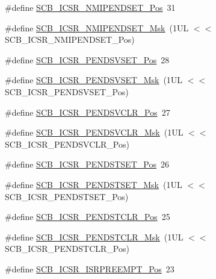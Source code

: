 \begin{DoxyCompactItemize}
\item 
\#define \mbox{\hyperlink{group___c_m_s_i_s___s_c_b_ga750d4b52624a46d71356db4ea769573b}{S\+C\+B\+\_\+\+I\+C\+S\+R\+\_\+\+N\+M\+I\+P\+E\+N\+D\+S\+E\+T\+\_\+\+Pos}}~31
\item 
\#define \mbox{\hyperlink{group___c_m_s_i_s___s_c_b_ga340e3f79e9c3607dee9f2c048b6b22e8}{S\+C\+B\+\_\+\+I\+C\+S\+R\+\_\+\+N\+M\+I\+P\+E\+N\+D\+S\+E\+T\+\_\+\+Msk}}~(1\+U\+L $<$$<$ S\+C\+B\+\_\+\+I\+C\+S\+R\+\_\+\+N\+M\+I\+P\+E\+N\+D\+S\+E\+T\+\_\+\+Pos)
\item 
\#define \mbox{\hyperlink{group___c_m_s_i_s___s_c_b_gab5ded23d2ab1d5ff7cc7ce746205e9fe}{S\+C\+B\+\_\+\+I\+C\+S\+R\+\_\+\+P\+E\+N\+D\+S\+V\+S\+E\+T\+\_\+\+Pos}}~28
\item 
\#define \mbox{\hyperlink{group___c_m_s_i_s___s_c_b_ga1e40d93efb402763c8c00ddcc56724ff}{S\+C\+B\+\_\+\+I\+C\+S\+R\+\_\+\+P\+E\+N\+D\+S\+V\+S\+E\+T\+\_\+\+Msk}}~(1\+U\+L $<$$<$ S\+C\+B\+\_\+\+I\+C\+S\+R\+\_\+\+P\+E\+N\+D\+S\+V\+S\+E\+T\+\_\+\+Pos)
\item 
\#define \mbox{\hyperlink{group___c_m_s_i_s___s_c_b_gae218d9022288f89faf57187c4d542ecd}{S\+C\+B\+\_\+\+I\+C\+S\+R\+\_\+\+P\+E\+N\+D\+S\+V\+C\+L\+R\+\_\+\+Pos}}~27
\item 
\#define \mbox{\hyperlink{group___c_m_s_i_s___s_c_b_ga4a901ace381d3c1c74ac82b22fae2e1e}{S\+C\+B\+\_\+\+I\+C\+S\+R\+\_\+\+P\+E\+N\+D\+S\+V\+C\+L\+R\+\_\+\+Msk}}~(1\+U\+L $<$$<$ S\+C\+B\+\_\+\+I\+C\+S\+R\+\_\+\+P\+E\+N\+D\+S\+V\+C\+L\+R\+\_\+\+Pos)
\item 
\#define \mbox{\hyperlink{group___c_m_s_i_s___s_c_b_ga9dbb3358c6167c9c3f85661b90fb2794}{S\+C\+B\+\_\+\+I\+C\+S\+R\+\_\+\+P\+E\+N\+D\+S\+T\+S\+E\+T\+\_\+\+Pos}}~26
\item 
\#define \mbox{\hyperlink{group___c_m_s_i_s___s_c_b_ga7325b61ea0ec323ef2d5c893b112e546}{S\+C\+B\+\_\+\+I\+C\+S\+R\+\_\+\+P\+E\+N\+D\+S\+T\+S\+E\+T\+\_\+\+Msk}}~(1\+U\+L $<$$<$ S\+C\+B\+\_\+\+I\+C\+S\+R\+\_\+\+P\+E\+N\+D\+S\+T\+S\+E\+T\+\_\+\+Pos)
\item 
\#define \mbox{\hyperlink{group___c_m_s_i_s___s_c_b_gadbe25e4b333ece1341beb1a740168fdc}{S\+C\+B\+\_\+\+I\+C\+S\+R\+\_\+\+P\+E\+N\+D\+S\+T\+C\+L\+R\+\_\+\+Pos}}~25
\item 
\#define \mbox{\hyperlink{group___c_m_s_i_s___s_c_b_gab241827d2a793269d8cd99b9b28c2157}{S\+C\+B\+\_\+\+I\+C\+S\+R\+\_\+\+P\+E\+N\+D\+S\+T\+C\+L\+R\+\_\+\+Msk}}~(1\+U\+L $<$$<$ S\+C\+B\+\_\+\+I\+C\+S\+R\+\_\+\+P\+E\+N\+D\+S\+T\+C\+L\+R\+\_\+\+Pos)
\item 
\#define \mbox{\hyperlink{group___c_m_s_i_s___s_c_b_ga11cb5b1f9ce167b81f31787a77e575df}{S\+C\+B\+\_\+\+I\+C\+S\+R\+\_\+\+I\+S\+R\+P\+R\+E\+E\+M\+P\+T\+\_\+\+Pos}}~23
$$
\end{DoxyCompactItemize}
